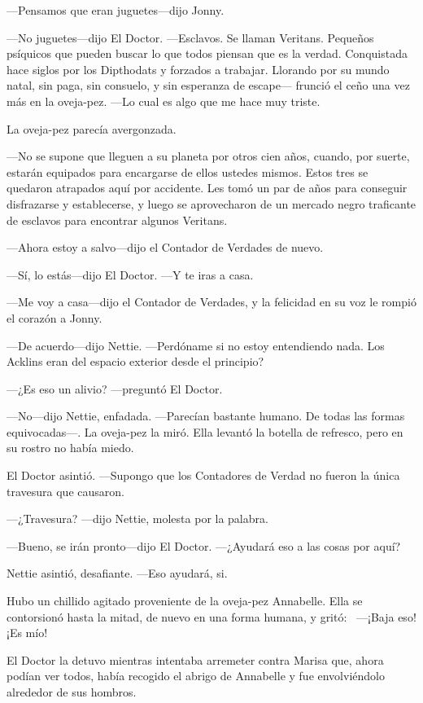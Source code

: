 ---Pensamos que eran juguetes---dijo Jonny.

---No juguetes---dijo El Doctor. ---Esclavos. Se llaman Veritans.
Pequeños psíquicos que pueden buscar lo que todos piensan que es la
verdad. Conquistada hace siglos por los Dipthodats y forzados a
trabajar. Llorando por su mundo natal, sin paga, sin consuelo, y sin
esperanza de escape--- frunció el ceño una vez más en la oveja-pez.
---Lo cual es algo que me hace muy triste.

La oveja-pez parecía avergonzada.

---No se supone que lleguen a su planeta por otros cien años, cuando,
por suerte, estarán equipados para encargarse de ellos ustedes mismos.
Estos tres se quedaron atrapados aquí por accidente. Les tomó un par de
años para conseguir disfrazarse y establecerse, y luego se aprovecharon
de un mercado negro traficante de esclavos para encontrar algunos
Veritans.

---Ahora estoy a salvo---dijo el Contador de Verdades de nuevo.

---Sí, lo estás---dijo El Doctor. ---Y te iras a casa.

---Me voy a casa---dijo el Contador de Verdades, y la felicidad en su
voz le rompió el corazón a Jonny.

---De acuerdo---dijo Nettie. ---Perdóname si no estoy entendiendo nada.
Los Acklins eran del espacio exterior desde el principio?

---¿Es eso un alivio? ---preguntó El Doctor.

---No---dijo Nettie, enfadada. ---Parecían bastante humano. De todas las
formas equivocadas---. La oveja-pez la miró. Ella levantó la botella de
refresco, pero en su rostro no había miedo.

El Doctor asintió. ---Supongo que los Contadores de Verdad no fueron la
única travesura que causaron.

---¿Travesura? ---dijo Nettie, molesta por la palabra.

---Bueno, se irán pronto---dijo El Doctor. ---¿Ayudará eso a las cosas
por aquí?

Nettie asintió, desafiante. ---Eso ayudará, si.

Hubo un chillido agitado proveniente de la oveja-pez Annabelle. Ella se
contorsionó hasta la mitad, de nuevo en una forma humana, y gritó:
~---¡Baja eso! ¡Es mío!

El Doctor la detuvo mientras intentaba arremeter contra Marisa que,
ahora podían ver todos, había recogido el abrigo de Annabelle y fue
envolviéndolo alrededor de sus hombros.

